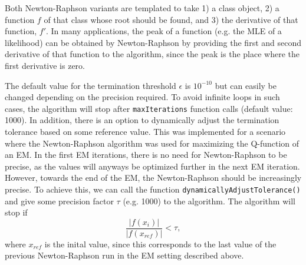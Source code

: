 \documentclass[a4paper,11pt]{article}
\newcommand{\privparam}[1]{\texttt{\textunderscore #1}}
\newcommand{\pubfunc}[1]{\texttt{#1()}}
\begin{document}
Both Newton-Raphson variants are templated to take 1) a class object, 2) a function $f$ of that class whose root should be found, and 3) the derivative of that function, $f'$. In many applications, the peak of a function (e.g. the MLE of a likelihood) can be obtained by Newton-Raphson by providing the first and second derivative of that function to the algorithm, since the peak is the place where the first derivative is zero.

The default value for the termination threshold $\epsilon$ is $10^{-10}$ but can easily be changed depending on the precision required. To avoid infinite loops in such cases, the algorithm will stop after \privparam{maxIterations} function calls (default value: 1000). In addition, there is an option to dynamically adjust the termination tolerance based on some reference value. This was implemented for a scenario where the Newton-Raphson algorithm was used for maximizing the Q-function of an EM. In the first EM iterations, there is no need for Newton-Raphson to be precise, as the values will anyways be optimized further in the next EM iteration. However, towards the end of the EM, the Newton-Raphson should be increasingly precise. To achieve this, we can call the function \pubfunc{dynamicallyAdjustTolerance} and give some precision factor $\tau$ (e.g. 1000) to the algorithm. The algorithm will stop if
\begin{equation*}
 \frac{|f(x_i)|}{|f(x_{ref})|} < \tau,
\end{equation*}
where $x_{ref}$ is the inital value, since this corresponds to the last value of the previous Newton-Raphson run in the EM setting described above.
\end{document}
